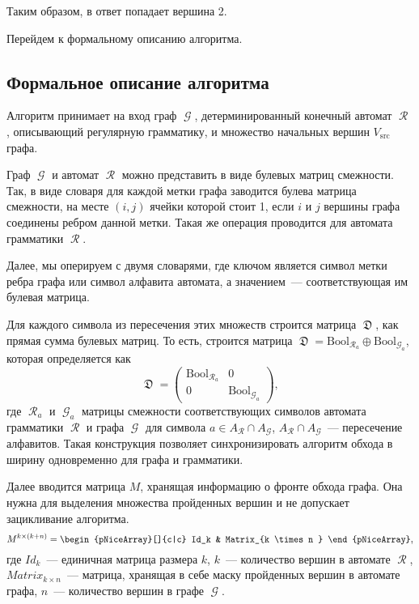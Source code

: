 Таким образом, в ответ попадает вершина 2.

Перейдем к формальному описанию алгоритма.

\subsection{Формальное описание алгоритма}

Алгоритм принимает на вход граф $\mscrG$, детерминированный конечный автомат $\mscrR$, описывающий регулярную грамматику, и множество начальных вершин $V_{\mathrm{src}}$ графа.

Граф $\mscrG$ и автомат $\mscrR$ можно представить в виде булевых матриц смежности.
Так, в виде словаря для каждой метки графа заводится булева матрица смежности, на месте $(i, j)$ ячейки которой стоит 1, если $i$ и $j$ вершины графа соединены ребром данной метки.
Такая же операция проводится для автомата грамматики $\mscrR$.

Далее, мы оперируем с двумя словарями, где ключом является символ метки ребра графа или символ алфавита автомата, а значением~--- соответствующая им булевая матрица.

Для каждого символа из пересечения этих множеств строится матрица $\mfrakD$, как прямая сумма булевых матриц.
То есть, строится матрица $\mfrakD = \mathrm{Bool}_{\mscrR_a} \oplus \mathrm{Bool}_{\mscrG_a}$, которая определяется как
\[
    \mfrakD = \begin{pmatrix}
        \mathrm{Bool}_{\mscrR_a} & 0                        \\
        0                        & \mathrm{Bool}_{\mscrG_a}
    \end{pmatrix},
\]
где $\mscrR_{a}$ и $\mscrG_{a}$ матрицы смежности соответствующих символов автомата грамматики $\mscrR$ и графа $\mscrG$ для символа $a \in A_\mscrR \cap A_\mscrG$, $A_\mscrR \cap A_\mscrG$~--- пересечение алфавитов.
Такая конструкция позволяет синхронизировать алгоритм обхода в ширину одновременно для графа и грамматики.

Далее вводится матрица $M$, хранящая информацию о фронте обхода графа.
Она нужна для выделения множества пройденных вершин и не допускает зацикливание алгоритма.
\[
    M^{k \times (k + n)} = \begin{pNiceArray}[]{c|c}
        Id_k & Matrix_{k \times n }
    \end{pNiceArray},
\]
где $Id_k$~--- единичная матрица размера $k$, $k$~--- количество вершин в автомате $\mscrR$, $Matrix_{k \times n }$~--- матрица, хранящая в себе маску пройденных вершин в автомате графа, $n$~--- количество вершин в графе $\mscrG$.


